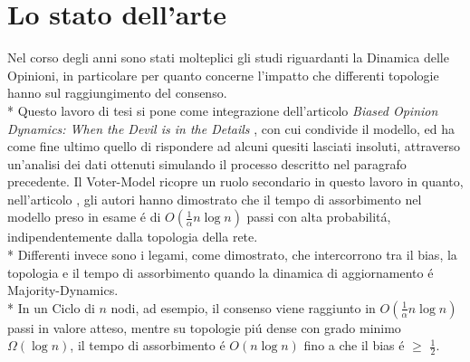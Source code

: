 \documentclass[../Tesi.tex]{subfiles}
\begin{document}
\section{Lo stato dell'arte}
Nel corso degli anni sono stati molteplici gli studi riguardanti la Dinamica delle Opinioni, in particolare per quanto concerne l'impatto che differenti topologie hanno sul raggiungimento del consenso.\\*
Questo lavoro di tesi si pone come integrazione dell'articolo \emph{Biased Opinion Dynamics: When the Devil is in the Details} \cite{DBLP:journals/corr/abs-2008-13589}, con cui condivide il modello, ed ha come fine ultimo quello di rispondere ad alcuni quesiti lasciati insoluti, attraverso un'analisi dei dati ottenuti simulando il processo descritto nel paragrafo precedente.
Il Voter-Model ricopre un ruolo secondario in questo lavoro in quanto, nell'articolo \cite{DBLP:journals/corr/abs-2008-13589}, gli autori hanno dimostrato che il tempo di assorbimento nel modello preso in esame \'e di $O(\frac{1}{\alpha}n\log{}n)$ passi con alta probabilit\'a, indipendentemente dalla topologia della rete.\\*
Differenti invece sono i legami, come dimostrato, che intercorrono tra il bias, la topologia e il tempo di assorbimento quando la dinamica di aggiornamento \'e Majority-Dynamics.\\*
In un Ciclo di $n$ nodi, ad esempio, il consenso viene raggiunto in $O(\frac{1}{\alpha}n\log{}n)$ passi in valore atteso, mentre su topologie pi\'u dense con grado minimo $\Omega(\log{}n)$, il tempo di assorbimento \'e $O(n\log{}n)$ fino a che il bias \'e $\geq$ $\frac{1}{2}$.
\end{document}
